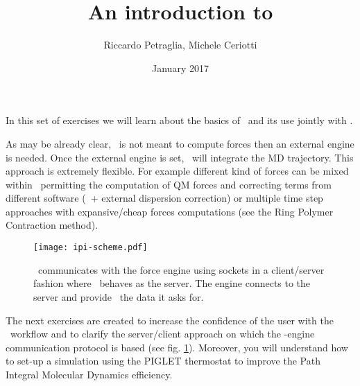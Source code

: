 \documentclass{article}
\title{An introduction to \ipi{}}
\author{Riccardo Petraglia, Michele Ceriotti}
\date{January 2017}
\begin{document}
\maketitle

In this set of exercises we will learn about the basics of \ipi\ and
its use jointly with \qe.  

As may be already clear, \ipi\ is not meant to compute forces then an
external engine is needed. Once the external engine is set, \ipi\ will
integrate the MD trajectory. This approach is extremely flexible. For
example different kind of forces can be mixed within
\ipi\ permitting the computation of QM forces and correcting terms from
different software (\PWscf\ + external dispersion correction) or
multiple time step approaches with expansive/cheap forces computations
(see the Ring Polymer Contraction method). 

\begin{figure}[h!]
\centering
\texttt{[image: ipi-scheme.pdf]}
\caption{\ipi\ communicates with the force engine using sockets in a
  client/server fashion where \ipi\ behaves as the server. The engine
  connects to the server and provide \ipi\ the data it asks
  for.}\label{fig:ipi-scheme}
\end{figure}


The next exercises are created to increase the confidence of the user
with the \ipi\ workflow and to clarify the server/client approach on
which the \ipi-engine communication protocol is based (see
fig. \ref{fig:ipi-scheme}). Moreover, you will understand how to
set-up a simulation using the PIGLET thermostat to improve the Path
Integral Molecular Dynamics efficiency.
\end{document}
